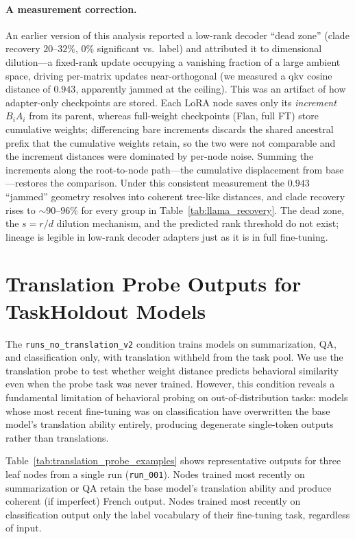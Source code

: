 \documentclass{article}
\begin{document}
\paragraph{A measurement correction.} An earlier version of this analysis reported a low-rank
decoder ``dead zone'' (clade recovery $20$--$32\%$, $0\%$ significant vs.\ label) and attributed it
to dimensional dilution---a fixed-rank update occupying a vanishing fraction of a large ambient
space, driving per-matrix updates near-orthogonal (we measured a qkv cosine distance of $0.943$,
apparently jammed at the ceiling). This was an artifact of how adapter-only checkpoints are stored.
Each LoRA node saves only its \emph{increment} $B_iA_i$ from its parent, whereas full-weight
checkpoints (Flan, full FT) store cumulative weights; differencing bare increments discards the
shared ancestral prefix that the cumulative weights retain, so the two were not comparable and the
increment distances were dominated by per-node noise. Summing the increments along the root-to-node
path---the cumulative displacement from base---restores the comparison. Under this consistent
measurement the $0.943$ ``jammed'' geometry resolves into coherent tree-like distances, and clade
recovery rises to $\sim$$90$--$96\%$ for every group in Table~\ref{tab:llama_recovery}. The dead
zone, the $s=r/d$ dilution mechanism, and the predicted rank threshold do not exist; lineage is
legible in low-rank decoder adapters just as it is in full fine-tuning.


\section{Translation Probe Outputs for TaskHoldout Models}
\label{app:translation_probe}

The \texttt{runs\_no\_translation\_v2} condition trains models on summarization,
QA, and classification only, with translation withheld from the task pool. We use
the translation probe to test whether weight distance predicts behavioral similarity
even when the probe task was never trained. However, this condition reveals a
fundamental limitation of behavioral probing on out-of-distribution tasks: models
whose most recent fine-tuning was on classification have overwritten the base
model's translation ability entirely, producing degenerate single-token outputs
rather than translations.

Table~\ref{tab:translation_probe_examples} shows representative outputs for three
leaf nodes from a single run (\texttt{run\_001}). Nodes trained most recently on
summarization or QA retain the base model's translation ability and produce
coherent (if imperfect) French output. Nodes trained most recently on
classification output only the label vocabulary of their fine-tuning task,
regardless of input.
\end{document}
